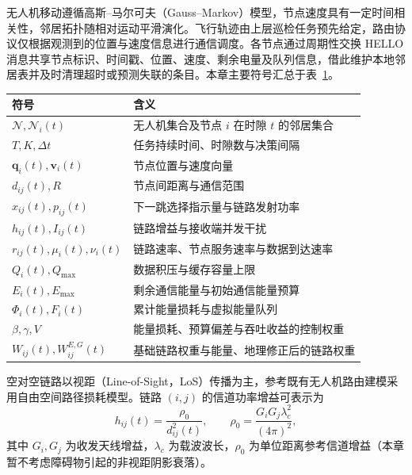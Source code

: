 无人机移动遵循高斯--马尔可夫（Gauss--Markov）模型，节点速度具有一定时间相关性，邻居拓扑随相对运动平滑演化。飞行轨迹由上层巡检任务预先给定，路由协议仅根据观测到的位置与速度信息进行通信调度。各节点通过周期性交换 HELLO 消息共享节点标识、时间戳、位置、速度、剩余电量及队列信息，借此维护本地邻居表并及时清理超时或预测失联的条目。本章主要符号汇总于表~\ref{rq1:tab:notation}。

\begin{table}[!htbp]
\centering\small
{}
\label{rq1:tab:notation}
\begin{tabularx}{\textwidth}{lX}
\toprule
符号 & 含义 \\
\midrule
$\mathcal{N},\mathcal{N}_i(t)$ & 无人机集合及节点 $i$ 在时隙 $t$ 的邻居集合 \\
$T,K,\Delta t$ & 任务持续时间、时隙数与决策间隔 \\
$\bm q_i(t),\bm v_i(t)$ & 节点位置与速度向量 \\
$d_{ij}(t),R$ & 节点间距离与通信范围 \\
$x_{ij}(t),p_{ij}(t)$ & 下一跳选择指示量与链路发射功率 \\
$h_{ij}(t),I_{ij}(t)$ & 链路增益与接收端并发干扰 \\
$r_{ij}(t),\mu_i(t),\nu_i(t)$ & 链路速率、节点服务速率与数据到达速率 \\
$Q_i(t),Q_{\max}$ & 数据积压与缓存容量上限 \\
$E_i(t),E_{\max}$ & 剩余通信能量与初始通信能量预算 \\
$\Phi_i(t),F_i(t)$ & 累计能量损耗与虚拟能量队列 \\
$\beta,\gamma,V$ & 能量损耗、预算偏差与吞吐收益的控制权重 \\
$W_{ij}(t),W_{ij}^{E,G}(t)$ & 基础链路权重与能量、地理修正后的链路权重 \\
\bottomrule
\end{tabularx}
\end{table}

空对空链路以视距（Line-of-Sight，LoS）传播为主，参考既有无人机路由建模\cite{qtar}采用自由空间路径损耗模型。链路 $(i,j)$ 的信道功率增益可表示为
\begin{equation}
 h_{ij}(t)=\frac{\rho_0}{d_{ij}^{2}(t)},\qquad
 \rho_0=\frac{G_iG_j\lambda_c^{2}}{(4\pi)^2},
 \label{rq1:eq:gain}
\end{equation}
其中 $G_i,G_j$ 为收发天线增益，$\lambda_c$ 为载波波长，$\rho_0$ 为单位距离参考信道增益（本章暂不考虑障碍物引起的非视距阴影衰落）。

